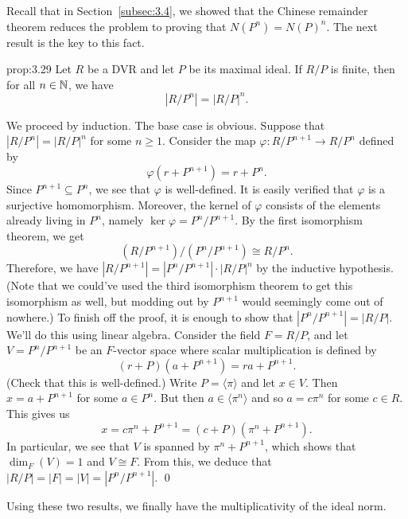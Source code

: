 Recall that in Section~\ref{subsec:3.4}, we showed that the Chinese 
remainder theorem reduces the problem to proving that 
$N(P^n) = N(P)^n$. The next result is the key to this fact. 

\begin{prop}{prop:3.29}
    Let $R$ be a DVR and let $P$ be its maximal ideal. If $R/P$ is finite, then 
    for all $n \in \mathbb{N}$, we have 
    \[ |R/P^n| = |R/P|^n. \] 
\end{prop}\vspace{-0.25cm}
\begin{pf}
    We proceed by induction. The base case is obvious. Suppose that 
    $|R/P^n| = |R/P|^n$ for some $n \geq 1$. Consider the map 
    $\varphi : R/P^{n+1} \to R/P^n$ defined by 
    \[ \varphi(r + P^{n+1}) = r + P^n. \]
    Since $P^{n+1} \subseteq P^n$, we see that $\varphi$ is well-defined. 
    It is easily verified that $\varphi$ is a surjective homomorphism. 
    Moreover, the kernel of $\varphi$ consists of the elements 
    already living in $P^n$, namely $\ker\varphi = P^n/P^{n+1}$. 
    By the first isomorphism theorem, we get 
    \[ (R/P^{n+1})/(P^n/P^{n+1}) \cong R/P^n. \] 
    Therefore, we have $|R/P^{n+1}| = |P^n/P^{n+1}| \cdot |R/P|^n$ by the 
    inductive hypothesis. (Note that we could've used the third 
    isomorphism theorem to get this isomorphism as well, but modding 
    out by $P^{n+1}$ would seemingly come out of nowhere.) 
    To finish off the proof, it is enough to show that $|P^n/P^{n+1}| 
    = |R/P|$. We'll do this using linear algebra. Consider the 
    field $F = R/P$, and let $V = P^n/P^{n+1}$ be an $F$-vector space 
    where scalar multiplication is defined by 
    \[ (r + P)(a + P^{n+1}) = ra + P^{n+1}. \] 
    (Check that this is well-defined.) Write $P = \langle \pi \rangle$ 
    and let $x \in V$. Then $x = a + P^{n+1}$ for some $a \in P^n$. 
    But then $a \in \langle \pi^n \rangle$ and so $a = c\pi^n$ for some $c \in R$. 
    This gives us 
    \[ x = c\pi^n + P^{n+1} = (c + P)(\pi^n + P^{n+1}). \] 
    In particular, we see that $V$ is spanned by $\pi^n + P^{n+1}$, which 
    shows that $\dim_F(V) = 1$ and $V \cong F$. From this, we deduce that 
    $|R/P| = |F| = |V| = |P^n/P^{n+1}|$. \qed 
\end{pf}\vspace{-0.25cm}

Using these two results, we finally have the multiplicativity of the ideal norm. 

